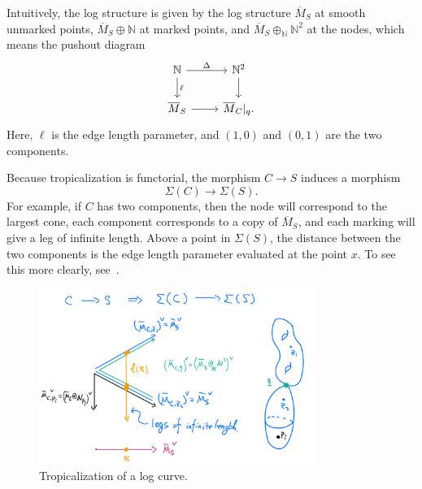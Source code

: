 \documentclass[10pt,oldfontcommands,oneside]{memoir}
\theoremstyle{definition}
\theoremstyle{remark}
\theoremstyle{plain}
\theoremstyle{definition}
\theoremstyle{remark}
\newcommand{\N}{\mathbb{N}}
\newcommand{\ol}[1]{\overline{#1}}
\newcommand{\1}{\mathbf{1}}
\newcommand{\2}{\mathbf{2}}
\newcommand{\3}{\mathbf{3}}
\begin{document}
Intuitively, the log structure is given by the log structure $\ol{M}_S$ at smooth unmarked points, $\ol{M}_S \oplus \N$ at marked points, and $\ol{M}_S \oplus_{\N} \N^2$ at the nodes, which means the pushout diagram
\begin{equation*}
\begin{tikzcd}
    \N \ar{r}{\Delta} \ar{d}{\ell} & \N^2 \ar{d} \\
    \ol{M}_S \ar{r} & \ol{M}_C|_q.
\end{tikzcd}
\end{equation*}
Here, $\ell$ is the edge length parameter, and $(1,0)$ and $(0,1)$ are the two components.

Because tropicalization is functorial, the morphism $C \to S$ induces a morphism
\[ \Sigma(C) \to \Sigma(S). \]
For example, if $C$ has two components, then the node will correspond to the largest cone, each component corresponds to a copy of $\ol{M}_S$, and each marking will give a leg of infinite length. Above a point in $\Sigma(S)$, the distance between the two components is the edge length parameter evaluated at the point $x$. To see this more clearly, see~.
\begin{figure}[htpb]
    \centering
    \includegraphics[width=0.8\textwidth]{tropcurve.png}
    \caption{Tropicalization of a log curve.}
    \label{fig:tropcurve-png}
\end{figure}
\end{document}
